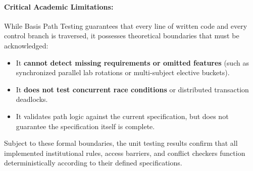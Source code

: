 \documentclass[11pt,a4paper]{article}
\begin{document}
\paragraph{Critical Academic Limitations:}
While Basis Path Testing guarantees that every line of written code and every control branch is traversed, it possesses theoretical boundaries that must be acknowledged:
\begin{itemize}
    \item It \textbf{cannot detect missing requirements or omitted features} (such as synchronized parallel lab rotations or multi-subject elective buckets).
    \item It \textbf{does not test concurrent race conditions} or distributed transaction deadlocks.
    \item It validates path logic against the current specification, but does not guarantee the specification itself is complete.
\end{itemize}
Subject to these formal boundaries, the unit testing results confirm that all implemented institutional rules, access barriers, and conflict checkers function deterministically according to their defined specifications.
\end{document}
